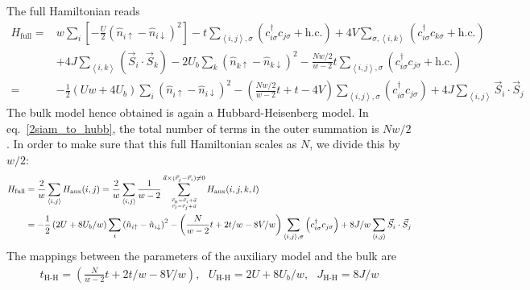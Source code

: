 \documentclass{report}
\numberwithin{equation}{section}
\begin{document}
 The full Hamiltonian reads
\begin{equation}\begin{aligned}
	H_\text{full} =& w\sum_i\left[- \frac{U}{2}\left(\hat n_{i \uparrow} - \hat n_{i \downarrow}\right)^2\right] - t\sum_{\left<i,j \right>,\sigma}\left(c^\dagger_{i\sigma}c_{j\sigma} + \text{h.c.}\right) + 4V\sum_{\sigma, \left<i,k\right>}\left(c^\dagger_{i\sigma}c_{k\sigma} + \text{h.c.}\right)\\
		      &+ 4J \sum_{\left<i,k\right>}\left(\vec{S}_{i}\cdot\vec{S}_{k}\right) - 2 U_b\sum_k\left(\hat n_{k \uparrow} - \hat n_{k \downarrow}\right)^2 - \frac{Nw/2}{w-2}t\sum_{\left<i,j \right>,\sigma}\left(c^\dagger_{i\sigma}c_{j\sigma} + \text{h.c.}\right)\\
	=& -\frac{1}{2}\left(Uw + 4U_b\right)\sum_i \left(\hat n_{i \uparrow} - \hat n_{i \downarrow}\right)^2 - \left(\frac{Nw/2}{w-2}t + t - 4V\right) \sum_{\left<i,j \right>,\sigma}\left(c^\dagger_{i\sigma}c_{j\sigma}\right) + 4J \sum_{\left<i,j \right>} \vec{S}_i\cdot\vec{S}_j
\end{aligned}\end{equation}
The bulk model hence obtained is again a Hubbard-Heisenberg model. In eq.~\ref{2siam_to_hubb}, the total number of terms in the outer summation is \(Nw/2\). In order to make sure that this full Hamiltonian scales as \(N\), we divide this by \(w/2\):
\begin{equation}\begin{aligned}
	\label{2siam_to_hubb}
	H_\text{full} &= \frac{2}{w}\sum_{\left<i,j\right>} H_\text{aux}(i,j) = \frac{2}{w}\sum_{\left<i,j\right>}\frac{1}{w - 2}\sum_{\vec r_k = \vec r_i + \vec a \atop{\vec r_l = \vec r_j + \vec a}}^{\vec a \times \left(\vec r_j - \vec r_i\right) \neq 0}H_\text{aux}(i,j,k,l)\\
		      &= -\frac{1}{2}\left(2U + 8U_b/w\right)\sum_i \left(\hat n_{i \uparrow} - \hat n_{i \downarrow}\right)^2 - \left(\frac{N}{w-2}t + 2t/w - 8V/w\right) \sum_{\left<i,j \right>,\sigma}\left(c^\dagger_{i\sigma}c_{j\sigma}\right) + 8J/w \sum_{\left<i,j \right>} \vec{S}_i\cdot\vec{S}_j
\end{aligned}\end{equation}
The mappings between the parameters of the auxiliary model and the bulk are
\begin{equation}\begin{aligned}
	t_\text{H-H} = \left(\frac{N}{w-2}t + 2t/w - 8V/w\right),~ ~ ~ U_\text{H-H} = 2U + 8U_b/w,~ ~ ~ J_\text{H-H} = 8J/w
\end{aligned}\end{equation}
\end{document}
